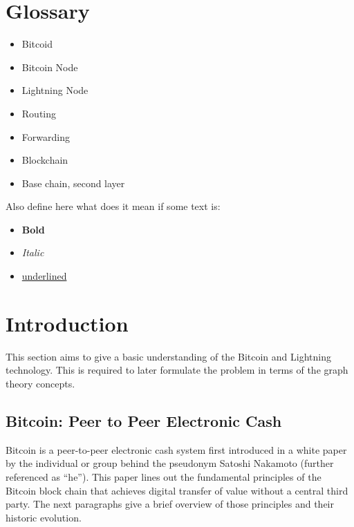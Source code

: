\documentclass[final]{fhnwreport}       %
\begin{document}
\section*{Glossary}


\begin{itemize}
  \item Bitcoid
  \item Bitcoin Node
  \item Lightning Node
  \item Routing
  \item Forwarding
  \item Blockchain
  \item Base chain, second layer
\end{itemize}
Also define here what does it mean if some text is:
\begin{itemize}
  \item \textbf{Bold}
  \item \textit{Italic}
  \item \underline{underlined}
\end{itemize}
\clearpage


\section{Introduction} This section aims to give a basic understanding of the Bitcoin and Lightning technology. This is required to later formulate the problem in terms of the graph theory concepts. 

\subsection{Bitcoin: Peer to Peer Electronic Cash}\label{subsec:peertopeer}
\cite{nakamoto_bitcoin_2008}
Bitcoin is a peer-to-peer electronic cash system first introduced in a white paper by the individual or group behind the pseudonym Satoshi Nakamoto (further referenced as ``he''). This paper lines out the fundamental principles of the Bitcoin block chain that achieves digital transfer of value without a central third party. The next paragraphs give a brief overview of those principles and their historic evolution. 
\end{document}
